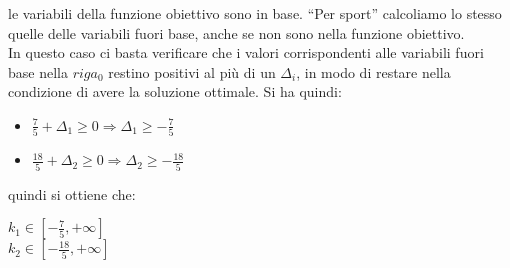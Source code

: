 \documentclass[a4paper,12pt, oneside]{book}
\begin{document}
\begin{itemize}
{  le variabili della funzione obiettivo sono in base. ``Per sport''
  calcoliamo lo stesso quelle delle variabili fuori base, anche se non
  sono nella funzione obiettivo}. \\
  In questo caso ci basta verificare che i valori corrispondenti alle
  variabili fuori base nella $riga_0$ restino positivi al più di un
  $\Delta_i$, in modo di restare nella condizione di avere la
  soluzione ottimale. Si ha quindi:
  \begin{itemize}[label=$\bullet$]
    \item $\frac{7}{5}+\Delta_1\geq 0\Longrightarrow \Delta_1\geq -\frac{7}{5}$
    \item $\frac{18}{5}+\Delta_2\geq 0\Longrightarrow \Delta_2\geq -\frac{18}{5}$
  \end{itemize}
  quindi si ottiene che:
  \begin{shaded}
    $k_1\in[-\frac{7}{5}, +\infty]$\\
    $k_2\in[-\frac{18}{5}, +\infty]$
  \end{shaded}
\end{itemize}
\end{document}
